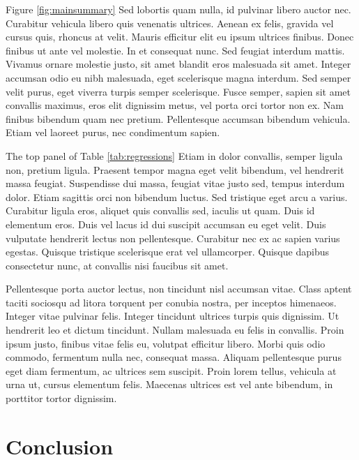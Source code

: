 \documentclass[12pt]{article}
\begin{document}
Figure \ref{fig:mainsummary} Sed lobortis quam nulla, id pulvinar libero auctor nec. Curabitur vehicula libero quis venenatis ultrices. Aenean ex felis, gravida vel cursus quis, rhoncus at velit. Mauris efficitur elit eu ipsum ultrices finibus. Donec finibus ut ante vel molestie. In et consequat nunc. Sed feugiat interdum mattis. Vivamus ornare molestie justo, sit amet blandit eros malesuada sit amet. Integer accumsan odio eu nibh malesuada, eget scelerisque magna interdum. Sed semper velit purus, eget viverra turpis semper scelerisque. Fusce semper, sapien sit amet convallis maximus, eros elit dignissim metus, vel porta orci tortor non ex. Nam finibus bibendum quam nec pretium. Pellentesque accumsan bibendum vehicula. Etiam vel laoreet purus, nec condimentum sapien.



The top panel of Table \ref{tab:regressions} Etiam in dolor convallis, semper ligula non, pretium ligula. Praesent tempor magna eget velit bibendum, vel hendrerit massa feugiat. Suspendisse dui massa, feugiat vitae justo sed, tempus interdum dolor. Etiam sagittis orci non bibendum luctus. Sed tristique eget arcu a varius. Curabitur ligula eros, aliquet quis convallis sed, iaculis ut quam. Duis id elementum eros. Duis vel lacus id dui suscipit accumsan eu eget velit. Duis vulputate hendrerit lectus non pellentesque. Curabitur nec ex ac sapien varius egestas. Quisque tristique scelerisque erat vel ullamcorper. Quisque dapibus consectetur nunc, at convallis nisi faucibus sit amet.

Pellentesque porta auctor lectus, non tincidunt nisl accumsan vitae. Class aptent taciti sociosqu ad litora torquent per conubia nostra, per inceptos himenaeos. Integer vitae pulvinar felis. Integer tincidunt ultrices turpis quis dignissim. Ut hendrerit leo et dictum tincidunt. Nullam malesuada eu felis in convallis. Proin ipsum justo, finibus vitae felis eu, volutpat efficitur libero. Morbi quis odio commodo, fermentum nulla nec, consequat massa. Aliquam pellentesque purus eget diam fermentum, ac ultrices sem suscipit. Proin lorem tellus, vehicula at urna ut, cursus elementum felis. Maecenas ultrices est vel ante bibendum, in porttitor tortor dignissim.

\section{Conclusion\label{sec:conclusion}}
\end{document}
